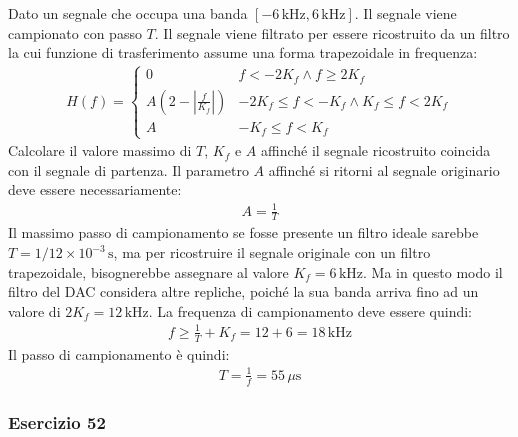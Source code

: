 \documentclass{article}
\begin{document}
Dato un segnale che occupa una banda $[-6\,\mathrm{kHz}, 6\,\mathrm{kHz}]$. Il segnale viene campionato con passo $T$. Il segnale viene filtrato per essere ricostruito da un filtro 
la cui funzione di trasferimento assume una forma trapezoidale in frequenza:
\begin{gather*}
    H(f)=\begin{cases}
        0 &f<-2K_f\land f\geq 2K_f\\
        A\left(2-\left|\displaystyle\frac{f}{K_f}\right|\right) &-2K_f\leq f<-K_f\land K_f\leq f<2K_f\\
        A & -K_f\leq f<K_f
    \end{cases}
\end{gather*}
Calcolare il valore massimo di $T$, $K_f$ e $A$ affinché il segnale ricostruito coincida con il segnale di partenza. 
Il parametro $A$ affinché si ritorni al segnale originario deve essere necessariamente: 
\begin{gather}
    A=\displaystyle\frac{1}{T}
\end{gather}
Il massimo passo di campionamento se fosse presente un filtro ideale sarebbe $T=1/12\times10^{-3}\,\mathrm{s}$, ma per ricostruire il segnale originale con un filtro trapezoidale, bisognerebbe 
assegnare al valore $K_f=6\,\mathrm{kHz}$. Ma in questo modo il filtro del DAC considera altre repliche, poiché la sua banda arriva fino ad un valore di $2K_f=12\,\mathrm{kHz}$. La frequenza di 
campionamento deve essere quindi:
\begin{gather*}
    f\geq\displaystyle\frac{1}{T}+K_f=12+6=18\,\mathrm{kHz}
\end{gather*}
Il passo di campionamento è quindi:
\begin{gather}
    T=\displaystyle\frac{1}{f}=55\,\mu \mathrm{s}
\end{gather}

\subsubsection*{Esercizio 52}
\end{document}
